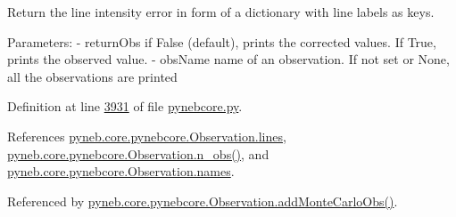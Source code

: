 \begin{DoxyVerb}Return the line intensity error in form of a dictionary with line labels as keys.

Parameters:
    - returnObs  if False (default), prints the corrected values. 
            If True, prints the observed value. 
    - obsName    name of an observation. If not set or None, all the observations are printed\end{DoxyVerb}
 

Definition at line \hyperlink{pynebcore_8py_source_l03931}{3931} of file \hyperlink{pynebcore_8py_source}{pynebcore.\-py}.



References \hyperlink{pynebcore_8py_source_l03542}{pyneb.\-core.\-pynebcore.\-Observation.\-lines}, \hyperlink{pynebcore_8py_source_l03642}{pyneb.\-core.\-pynebcore.\-Observation.\-n\-\_\-obs()}, and \hyperlink{pynebcore_8py_source_l03543}{pyneb.\-core.\-pynebcore.\-Observation.\-names}.



Referenced by \hyperlink{pynebcore_8py_source_l04069}{pyneb.\-core.\-pynebcore.\-Observation.\-add\-Monte\-Carlo\-Obs()}.


